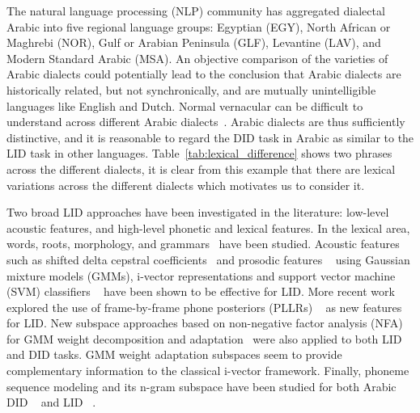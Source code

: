 \documentclass{article}
\begin{document}
The natural language processing (NLP) community has aggregated dialectal Arabic into five regional language groups: Egyptian (EGY), North African or Maghrebi (NOR), Gulf or Arabian Peninsula (GLF), Levantine (LAV), and Modern Standard Arabic (MSA). An objective comparison of the varieties of Arabic dialects could potentially lead to the conclusion that Arabic dialects are historically related, but not synchronically, and are mutually unintelligible languages like English and Dutch. Normal vernacular can be difficult to understand across different Arabic dialects~\cite{holes2004modern}. Arabic dialects are thus sufficiently distinctive, and it is reasonable to regard the DID task in Arabic as similar to the LID task in other languages.  Table~\ref{tab:lexical_difference} shows two phrases across the different dialects, it is clear from this example that there are lexical variations across the different dialects which motivates us to consider it.

Two broad LID approaches have been investigated in the literature:  low-level acoustic features, and high-level phonetic and lexical features. In the lexical area, words, roots, morphology, and grammars~\cite{reynolds2008lid,ambikairajah2011language} have been studied. Acoustic features such as shifted delta cepstral coefficients~\cite{dehak2011language} and prosodic features ~\cite{martinez2012ivector} using Gaussian mixture models (GMMs), i-vector representations and support vector machine (SVM) classifiers ~\cite{dehak2011language} have been shown to be effective for LID. More recent work explored the use of frame-by-frame phone posteriors (PLLRs) ~\cite{plchot2014pllr} as new features for LID. New subspace approaches based on non-negative factor analysis (NFA) for GMM weight decomposition and adaptation~\cite{bahari2014non} were also applied to both LID and DID tasks. GMM weight adaptation subspaces seem to provide complementary information to the classical i-vector framework. Finally, phoneme sequence modeling and its n-gram subspace have been studied for both Arabic DID ~\cite{soltau2011modern} and LID ~\cite{soufifar2012discriminative}.
\end{document}

